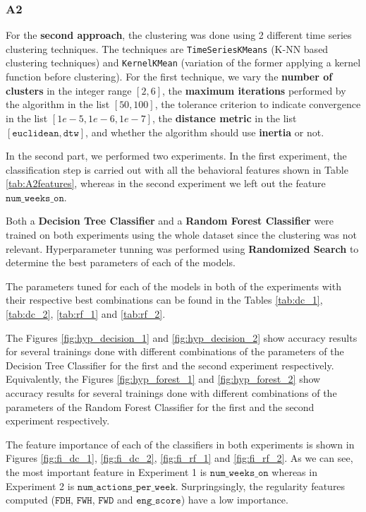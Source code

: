 \documentclass[sigplan,screen]{acmart}
\begin{document}
\subsubsection{A2}
For the \textbf{second approach}, the clustering was done using 2 different time series clustering techniques. The techniques are \texttt{TimeSeriesKMeans} (K-NN based clustering techniques) and \texttt{KernelKMean} (variation of the former applying a kernel function before clustering). For the first technique, we vary the \textbf{number of clusters} in the integer range $[2, 6]$, the \textbf{maximum iterations} performed by the algorithm in the list $[50, 100]$, the tolerance criterion to indicate convergence in the list $[1e-5, 1e-6, 1e-7]$, the \textbf{distance metric} in the list $[\texttt{euclidean}, \texttt{dtw}]$, and whether the algorithm should use \textbf{inertia} or not.

In the second part, we performed two experiments. In the first experiment, the classification step is carried out with all the behavioral features shown in Table \ref{tab:A2features}, whereas in the second experiment we left out the feature $\texttt{num\_weeks\_on}$.

Both a \textbf{Decision Tree Classifier} and a \textbf{Random Forest Classifier} were trained on both experiments using the whole dataset since the clustering was not relevant. Hyperparameter tunning was performed using \textbf{Randomized Search} to determine the best parameters of each of the models.

The parameters tuned for each of the models in both of the experiments with their respective best combinations can be found in the Tables \ref{tab:dc_1}, \ref{tab:dc_2}, \ref{tab:rf_1} and \ref{tab:rf_2}.

The Figures \ref{fig:hyp_decision_1} and \ref{fig:hyp_decision_2} show accuracy results for several trainings done with different combinations of the parameters of the Decision Tree Classifier for the first and the second experiment respectively. Equivalently, the Figures \ref{fig:hyp_forest_1} and \ref{fig:hyp_forest_2} show accuracy results for several trainings done with different combinations of the parameters of the Random Forest Classifier for the first and the second experiment respectively.

The feature importance of each of the classifiers in both experiments is shown in Figures \ref{fig:fi_dc_1},
\ref{fig:fi_dc_2}, \ref{fig:fi_rf_1} and \ref{fig:fi_rf_2}. As we can see, the most important feature in Experiment 1 is $\texttt{num\_weeks\_on}$ whereas in Experiment 2 is $\texttt{num\_actions\_per\_week}$. Surpringsingly, the regularity features computed ($\texttt{FDH}$, $\texttt{FWH}$, $\texttt{FWD}$ and $\texttt{eng\_score}$) have a low importance.
\end{document}
